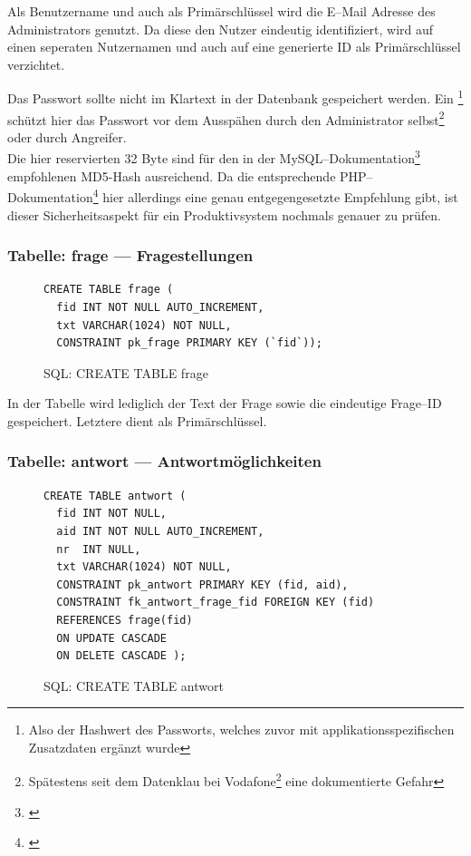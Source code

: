 Als Benutzername und auch als Primärschlüssel wird die E--Mail Adresse des Administrators genutzt. Da diese den Nutzer eindeutig identifiziert, wird auf einen seperaten Nutzernamen und auch auf eine generierte ID als Primärschlüssel verzichtet.

Das Passwort sollte nicht im Klartext in der Datenbank gespeichert werden. Ein \footnote{Also der Hashwert des Passworts, welches zuvor mit applikationsspezifischen Zusatzdaten ergänzt wurde} schützt hier das Passwort vor dem Ausspähen durch den Administrator selbst\footnote{Spätestens seit dem Datenklau bei Vodafone\footnote{\cite{vodafone}} eine dokumentierte Gefahr} oder durch Angreifer.\\
Die hier reservierten 32 Byte sind für den in der MySQL--Dokumentation\footnote{\cite{mysql:md5}} empfohlenen MD5-Hash ausreichend. Da die entsprechende PHP--Dokumentation\footnote{\cite{php:md5}} hier allerdings eine genau entgegengesetzte Empfehlung gibt, ist dieser Sicherheitsaspekt für ein Produktivsystem nochmals genauer zu prüfen.

\subsubsection{Tabelle: frage --- Fragestellungen}
\begin{figure}[H]
\begin{spacing}{1.0}
\begin{verbatim}
CREATE TABLE frage (
  fid INT NOT NULL AUTO_INCREMENT,
  txt VARCHAR(1024) NOT NULL,
  CONSTRAINT pk_frage PRIMARY KEY (`fid`));
\end{verbatim}
\caption{SQL: CREATE TABLE frage}
\label{sql:tblfrage}
\end{spacing}
\end{figure}

In der Tabelle  wird lediglich der Text der Frage sowie die eindeutige Frage--ID gespeichert. Letztere dient als Primärschlüssel.

\subsubsection{Tabelle: antwort --- Antwortmöglichkeiten}
\begin{figure}[H]
\begin{spacing}{1.0}
\begin{verbatim}
CREATE TABLE antwort (
  fid INT NOT NULL, 
  aid INT NOT NULL AUTO_INCREMENT,
  nr  INT NULL,
  txt VARCHAR(1024) NOT NULL,
  CONSTRAINT pk_antwort PRIMARY KEY (fid, aid),
  CONSTRAINT fk_antwort_frage_fid FOREIGN KEY (fid) 
  REFERENCES frage(fid) 
  ON UPDATE CASCADE 
  ON DELETE CASCADE );
\end{verbatim}
\caption{SQL: CREATE TABLE antwort}
\label{sql:tblantwort}
\end{spacing}
\end{figure}

